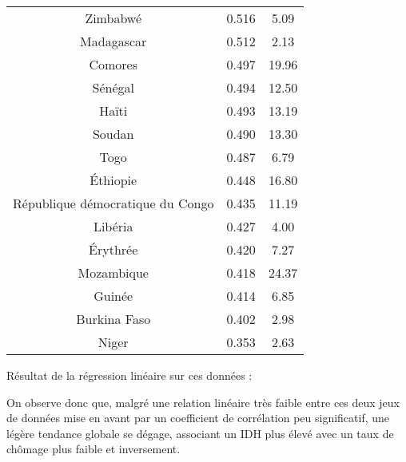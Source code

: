 \documentclass[paper=a4, fontsize=11pt]{scrartcl} %
\numberwithin{equation}{section} %
\numberwithin{figure}{section} %
\numberwithin{table}{section} %
\begin{document}
\begin{longtable}{|c|c|c|}
Zimbabwé	& 0.516 & 5.09 \\
Madagascar	& 0.512 & 2.13 \\
Comores	& 0.497 & 19.96 \\
Sénégal	& 0.494 & 12.50 \\
Haïti	& 0.493 & 13.19 \\
Soudan	& 0.490 & 13.30 \\
Togo	& 0.487 & 6.79 \\
Éthiopie	& 0.448 & 16.80 \\
République démocratique du Congo	& 0.435 & 11.19 \\
Libéria	& 0.427 & 4.00 \\
Érythrée	& 0.420 & 7.27 \\
Mozambique	& 0.418 & 24.37 \\
Guinée	& 0.414 & 6.85 \\
Burkina Faso	& 0.402 & 2.98  \\
Niger	& 0.353 & 2.63 \\
\hline
\end{longtable}

\newpage
Résultat de la régression linéaire sur ces données :\\
\begin{center}
\end{center}
\begin{center}
\end{center}

On observe donc que, malgré une relation linéaire très faible entre ces deux jeux de données mise en avant par un coefficient de corrélation peu significatif, une légère tendance globale se dégage, associant un IDH plus élevé avec un taux de chômage plus faible et inversement.
\end{document}
